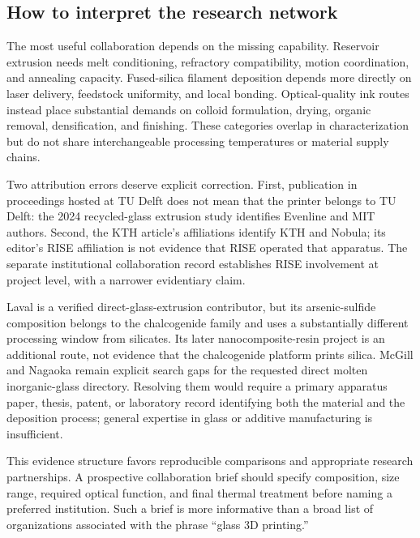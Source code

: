 \subsection{How to interpret the research network}
The most useful collaboration depends on the missing capability. Reservoir extrusion needs melt conditioning, refractory compatibility, motion coordination, and annealing capacity. Fused-silica filament deposition depends more directly on laser delivery, feedstock uniformity, and local bonding. Optical-quality ink routes instead place substantial demands on colloid formulation, drying, organic removal, densification, and finishing. These categories overlap in characterization but do not share interchangeable processing temperatures or material supply chains.

Two attribution errors deserve explicit correction. First, publication in proceedings hosted at TU Delft does not mean that the printer belongs to TU Delft: the 2024 recycled-glass extrusion study identifies Evenline and MIT authors.\cite{acad_stern2024} Second, the KTH article's affiliations identify KTH and Nobula; its editor's RISE affiliation is not evidence that RISE operated that apparatus. The separate institutional collaboration record establishes RISE involvement at project level, with a narrower evidentiary claim.\cite{acad_liu2022,acad_kthrise}

Laval is a verified direct-glass-extrusion contributor, but its arsenic-sulfide composition belongs to the chalcogenide family and uses a substantially different processing window from silicates.\cite{acad_baudet2019} Its later nanocomposite-resin project is an additional route, not evidence that the chalcogenide platform prints silica.\cite{acad_lavalproject} McGill and Nagaoka remain explicit search gaps for the requested direct molten inorganic-glass directory. Resolving them would require a primary apparatus paper, thesis, patent, or laboratory record identifying both the material and the deposition process; general expertise in glass or additive manufacturing is insufficient.

This evidence structure favors reproducible comparisons and appropriate research partnerships. A prospective collaboration brief should specify composition, size range, required optical function, and final thermal treatment before naming a preferred institution. Such a brief is more informative than a broad list of organizations associated with the phrase ``glass 3D printing.''
